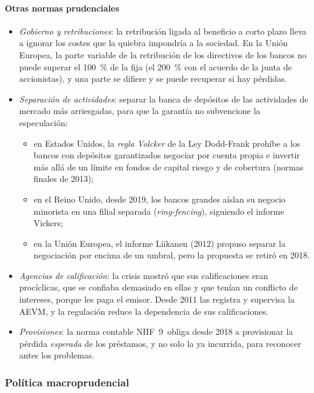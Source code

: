 \documentclass[11pt]{article}
\begin{document}
\paragraph{Otras normas prudenciales}

\begin{itemize}
\item \emph{Gobierno y retribuciones}: la retribución ligada al beneficio a corto plazo lleva a ignorar los costes que la quiebra impondría a la sociedad. En la Unión Europea, la parte variable de la retribución de los directivos de los bancos no puede superar el 100~\% de la fija (el 200~\% con el acuerdo de la junta de accionistas), y una parte se difiere y se puede recuperar si hay pérdidas\nocite{DirUE2013CRD}.
\item \emph{Separación de actividades}: separar la banca de depósitos de las actividades de mercado más arriesgadas, para que la garantía no subvencione la especulación:
  \begin{itemize}
  \item en Estados Unidos, la \emph{regla Volcker} de la Ley Dodd-Frank prohíbe a los bancos con depósitos garantizados negociar por cuenta propia e invertir más allá de un límite en fondos de capital riesgo y de cobertura (normas finales de 2013)\nocite{Fed2013Volcker};
  \item en el Reino Unido, desde 2019, los bancos grandes aíslan su negocio minorista en una filial separada (\emph{ring-fencing}), siguiendo el informe Vickers\nocite{BoE2026RingFencing};
  \item en la Unión Europea, el informe Liikanen (2012) propuso separar la negociación por encima de un umbral, pero la propuesta se retiró en 2018.
  \end{itemize}
\item \emph{Agencias de calificación}: la crisis mostró que sus calificaciones eran procíclicas, que se confiaba demasiado en ellas y que tenían un conflicto de intereses, porque les paga el emisor. Desde 2011 las registra y supervisa la AEVM, y la regulación reduce la dependencia de sus calificaciones.
\item \emph{Provisiones}: la norma contable NIIF~9~obliga desde 2018 a provisionar la pérdida \emph{esperada} de los préstamos, y no solo la ya incurrida, para reconocer antes los problemas.
\end{itemize}

\subsubsection{Política macroprudencial}\label{sec:macroprudencial}
\end{document}
